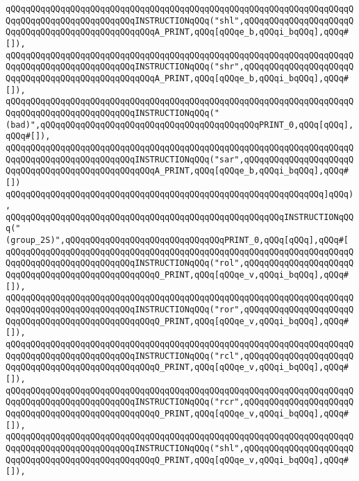 \verb|qQQqqQQqqQQqqQQqqQQqqQQqqQQqqQQqqQQqqQQqqQQqqQQqqQQqqQQqqQQqqQQqqQQqqQQqqQQqqQQqqQQqqQQqqQQqqQQqINSTRUCTIONqQQq("shl",qQQqqQQqqQQqqQQqqQQqqQQqqQQqqQQqqQQqqQQqqQQqqQQqqQQqA_PRINT,qQQq[qQQqe_b,qQQqi_bqQQq],qQQq#[]),|\newline
\verb|qQQqqQQqqQQqqQQqqQQqqQQqqQQqqQQqqQQqqQQqqQQqqQQqqQQqqQQqqQQqqQQqqQQqqQQqqQQqqQQqqQQqqQQqqQQqqQQqINSTRUCTIONqQQq("shr",qQQqqQQqqQQqqQQqqQQqqQQqqQQqqQQqqQQqqQQqqQQqqQQqqQQqA_PRINT,qQQq[qQQqe_b,qQQqi_bqQQq],qQQq#[]),|\newline
\verb|qQQqqQQqqQQqqQQqqQQqqQQqqQQqqQQqqQQqqQQqqQQqqQQqqQQqqQQqqQQqqQQqqQQqqQQqqQQqqQQqqQQqqQQqqQQqqQQqINSTRUCTIONqQQq("(bad)",qQQqqQQqqQQqqQQqqQQqqQQqqQQqqQQqqQQqqQQqqQQqPRINT_0,qQQq[qQQq],qQQq#[]),|\newline
\verb|qQQqqQQqqQQqqQQqqQQqqQQqqQQqqQQqqQQqqQQqqQQqqQQqqQQqqQQqqQQqqQQqqQQqqQQqqQQqqQQqqQQqqQQqqQQqqQQqINSTRUCTIONqQQq("sar",qQQqqQQqqQQqqQQqqQQqqQQqqQQqqQQqqQQqqQQqqQQqqQQqqQQqA_PRINT,qQQq[qQQqe_b,qQQqi_bqQQq],qQQq#[])|\newline
\verb|qQQqqQQqqQQqqQQqqQQqqQQqqQQqqQQqqQQqqQQqqQQqqQQqqQQqqQQqqQQqqQQq]qQQq),|\newline
\verb|qQQqqQQqqQQqqQQqqQQqqQQqqQQqqQQqqQQqqQQqqQQqqQQqqQQqqQQqINSTRUCTIONqQQq("(group_2S)",qQQqqQQqqQQqqQQqqQQqqQQqqQQqqQQqPRINT_0,qQQq[qQQq],qQQq#[|\newline
\verb|qQQqqQQqqQQqqQQqqQQqqQQqqQQqqQQqqQQqqQQqqQQqqQQqqQQqqQQqqQQqqQQqqQQqqQQqqQQqqQQqqQQqqQQqqQQqqQQqINSTRUCTIONqQQq("rol",qQQqqQQqqQQqqQQqqQQqqQQqqQQqqQQqqQQqqQQqqQQqqQQqqQQqQ_PRINT,qQQq[qQQqe_v,qQQqi_bqQQq],qQQq#[]),|\newline
\verb|qQQqqQQqqQQqqQQqqQQqqQQqqQQqqQQqqQQqqQQqqQQqqQQqqQQqqQQqqQQqqQQqqQQqqQQqqQQqqQQqqQQqqQQqqQQqqQQqINSTRUCTIONqQQq("ror",qQQqqQQqqQQqqQQqqQQqqQQqqQQqqQQqqQQqqQQqqQQqqQQqqQQqQ_PRINT,qQQq[qQQqe_v,qQQqi_bqQQq],qQQq#[]),|\newline
\verb|qQQqqQQqqQQqqQQqqQQqqQQqqQQqqQQqqQQqqQQqqQQqqQQqqQQqqQQqqQQqqQQqqQQqqQQqqQQqqQQqqQQqqQQqqQQqqQQqINSTRUCTIONqQQq("rcl",qQQqqQQqqQQqqQQqqQQqqQQqqQQqqQQqqQQqqQQqqQQqqQQqqQQqQ_PRINT,qQQq[qQQqe_v,qQQqi_bqQQq],qQQq#[]),|\newline
\verb|qQQqqQQqqQQqqQQqqQQqqQQqqQQqqQQqqQQqqQQqqQQqqQQqqQQqqQQqqQQqqQQqqQQqqQQqqQQqqQQqqQQqqQQqqQQqqQQqINSTRUCTIONqQQq("rcr",qQQqqQQqqQQqqQQqqQQqqQQqqQQqqQQqqQQqqQQqqQQqqQQqqQQqQ_PRINT,qQQq[qQQqe_v,qQQqi_bqQQq],qQQq#[]),|\newline
\verb|qQQqqQQqqQQqqQQqqQQqqQQqqQQqqQQqqQQqqQQqqQQqqQQqqQQqqQQqqQQqqQQqqQQqqQQqqQQqqQQqqQQqqQQqqQQqqQQqINSTRUCTIONqQQq("shl",qQQqqQQqqQQqqQQqqQQqqQQqqQQqqQQqqQQqqQQqqQQqqQQqqQQqQ_PRINT,qQQq[qQQqe_v,qQQqi_bqQQq],qQQq#[]),|\newline
